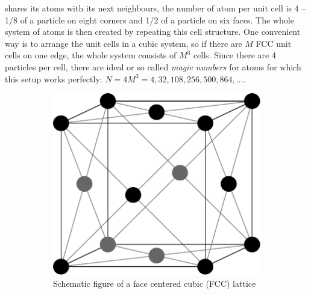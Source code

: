 \documentclass[12pt]{article}
\begin{document}
shares its atoms with its next neighbours, the number of atom per unit cell is 4 -- 1/8 of a particle on eight corners and 1/2 of a particle on six faces.
The whole system of atoms is then created by repeating this cell structure. One convenient way is to arrange the unit cells in a cubic system, 
so if there are $M$ FCC unit cells on one edge, the whole system consists of $M^3$ cells. Since there are 4 particles per cell, 
there are ideal or so called \textit{magic numbers} for atoms for which this setup works perfectly: $N = 4M^3 = 4,32,108,256,500,864,\ldots$.\\
\begin{figure}[h]
    \begin{center}
        \begin{subfigure}[t]{0.4\textwidth}
            \includegraphics[scale=0.3]{images/fcc-2.pdf}
            \caption{Schematic figure of a face centered cubic (FCC) lattice}
            \label{fig:fcc}
        \end{subfigure} 
        \
        \begin{subfigure}[t]{0.4\textwidth}

\end{subfigure}
\end{center}
\end{figure}
\end{document}
